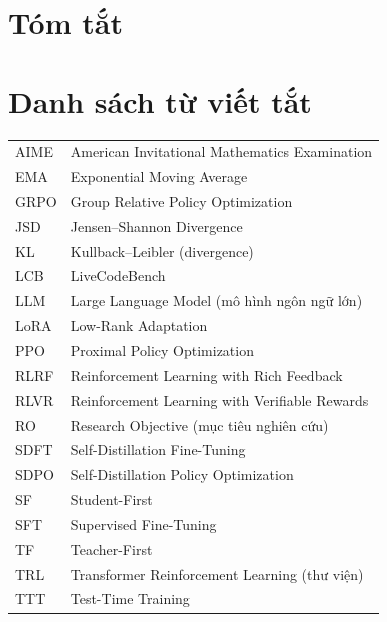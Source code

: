 \documentclass[12pt,a4paper]{report}
\begin{document}
\chapter*{Tóm tắt}


\tableofcontents

\clearpage
{}
\listoffigures

\clearpage
{}
\listoftables

\clearpage
\chapter*{Danh sách từ viết tắt}
\begin{longtable}{@{}p{2.6cm}l@{}}
AIME & American Invitational Mathematics Examination \\
EMA  & Exponential Moving Average \\
GRPO & Group Relative Policy Optimization \\
JSD  & Jensen--Shannon Divergence \\
KL   & Kullback--Leibler (divergence) \\
LCB  & LiveCodeBench \\
LLM  & Large Language Model (mô hình ngôn ngữ lớn) \\
LoRA & Low-Rank Adaptation \\
PPO  & Proximal Policy Optimization \\
RLRF & Reinforcement Learning with Rich Feedback \\
RLVR & Reinforcement Learning with Verifiable Rewards \\
RO   & Research Objective (mục tiêu nghiên cứu) \\
SDFT & Self-Distillation Fine-Tuning \\
SDPO & Self-Distillation Policy Optimization \\
SF   & Student-First \\
SFT  & Supervised Fine-Tuning \\
TF   & Teacher-First \\
TRL  & Transformer Reinforcement Learning (thư viện) \\
TTT  & Test-Time Training \\
\end{longtable}











\appendix

\end{document}
